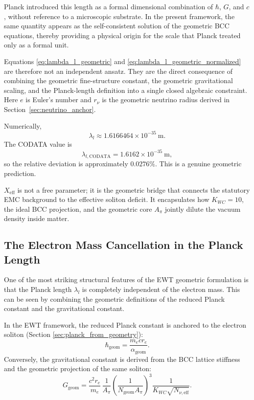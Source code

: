 \documentclass[10pt,a4paper]{article}
\begin{document}
Planck introduced this length as a formal dimensional combination
of \(\hbar\), \(G\), and \(c\), without reference to a microscopic
substrate. In the present framework, the same quantity appears as
the self-consistent solution of the geometric BCC equations,
thereby providing a physical origin for the scale that Planck
treated only as a formal unit.

Equations \eqref{eq:lambda_l_geometric} and \eqref{eq:lambda_l_geometric_normalized} are therefore not an independent ansatz. They are the direct consequence of combining the geometric fine-structure constant, the geometric gravitational scaling, and the Planck-length definition into a single closed algebraic constraint. Here \(e\) is Euler's number and \(r_\nu\) is the geometric neutrino radius derived in Section~\ref{sec:neutrino_anchor}.

Numerically,
\begin{equation}
	\lambda_l
	\approx
	1.6166464 \times 10^{-35}\ \text{m}.
\end{equation}
The CODATA value is
\begin{equation}
	\lambda_{l,\text{CODATA}}
	=
	1.6162 \times 10^{-35}\ \text{m},
\end{equation}
so the relative deviation is approximately \(0.0276\%\). This is a genuine geometric prediction.

\(X_{\text{eff}}\) is not a free parameter; it is the geometric bridge that connects the statutory EMC background to the effective soliton deficit. It encapsulates how \(K_{WC}=10\), the ideal BCC projection, and the geometric core \(A_\pi\) jointly dilute the vacuum density inside matter.

\subsection{The Electron Mass Cancellation in the Planck Length}
\label{sec:planck_mass_cancellation}

One of the most striking structural features of the EWT geometric formulation is that the Planck length \(\lambda_l\) is completely independent of the electron mass. This can be seen by combining the geometric definitions of the reduced Planck constant and the gravitational constant.

In the EWT framework, the reduced Planck constant is anchored to the electron soliton (Section \ref{sec:planck_from_geometry}):
\begin{equation}
	\hbar_{\text{geom}} = \frac{m_e c r_e}{\alpha_{\text{geom}}}.
	\label{eq:hbar_mass_dep}
\end{equation}
Conversely, the gravitational constant is derived from the BCC lattice stiffness and the geometric projection of the same soliton:
\begin{equation}
	G_{\text{geom}} = \frac{c^2 r_e}{m_e} \, \frac{1}{A_\pi} \left(\frac{1}{N_{\text{geom}} A_\pi}\right)^3 \frac{1}{K_{WC} \sqrt{N_{\nu,\text{eff}}}}.
	\label{eq:G_mass_dep}
\end{equation}
\end{document}

